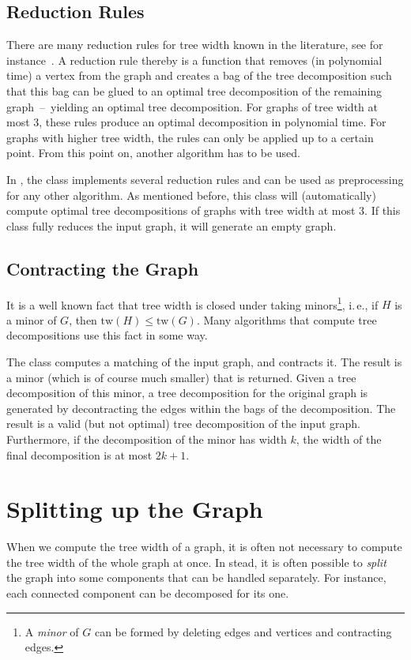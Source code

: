 \documentclass[a4paper, ukenglish, twoside, openright]{jdrasilmanual}
\begin{document}
\section{Reduction Rules}
There are many reduction rules for tree width known in the
literature, see for instance~\cite{DowneyF2013}. A reduction rule thereby is a function that removes (in
polynomial time) a vertex from the graph and creates a bag of the
tree decomposition such that this bag can be glued to an optimal
tree decomposition of the remaining graph~–~yielding  an optimal
tree decomposition. For graphs of tree width at most 3, these rules
produce an optimal decomposition in polynomial time.  For graphs with
higher tree width, the rules can only be applied up to a certain
point. From this point on, another algorithm has to be used.

In \Jdrasil, the class  implements several
reduction rules and can be used as preprocessing for any other
algorithm. As mentioned before, this class will (automatically)
compute optimal tree decompositions of graphs with tree width at most
$3$. If this class fully reduces the input graph, it will generate an
empty graph.

\section{Contracting the Graph}
It is a well known fact that tree width is closed under taking
minors\footnote{A \emph{minor} of $G$ can be formed by deleting edges
  and vertices and contracting edges.},
i.\,e., if \(H\) is a minor of \(G\), then \(\mathrm{tw}(H)\leq
\mathrm{tw}(G)\). Many algorithms that compute tree decompositions use
this fact in some way.
  
The  class computes a matching of the input graph, and
contracts it. The result is a minor (which is of course much smaller)
that is returned. Given a tree decomposition of this minor, a tree
decomposition for the original graph is generated by decontracting the
edges within the bags of the decomposition. The result is a valid (but
not optimal) tree decomposition of the input graph. Furthermore, if
the decomposition of the minor has width \(k\), the width of the final
decomposition is at most \(2k+1\).
  
\chapter{Splitting up the Graph}
When we compute the tree width of a graph, it is often not necessary
to compute the tree width of the whole graph at once. In stead, it is
often possible to \emph{split} the graph into some components that can
be handled separately. For instance, each connected component can be
decomposed for its one.
\end{document}
